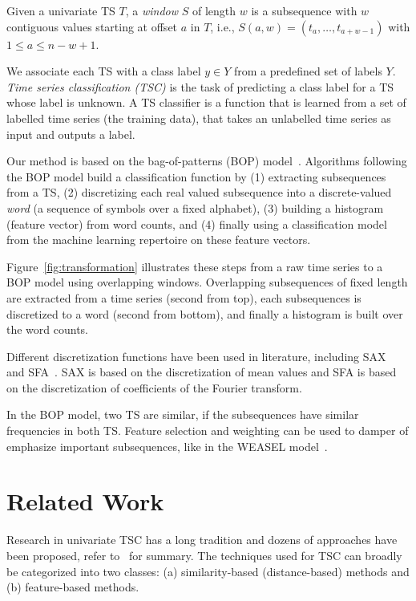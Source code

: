 \documentclass[sigconf]{acmart}
\begin{document}
Given a univariate TS $T$, a \emph{window} $S$ of length $w$ is a subsequence with $w$ contiguous values starting at offset $a$ in $T$, i.e., $S(a,w)=(t_{a},\dots,t_{a+w-1})$ with $1\leq a\leq n-w+1$.

We associate each TS with a class label $y\in Y$ from a predefined set of labels $Y$. \emph{Time series classification (TSC)} is the task of predicting a class label for a TS whose label is unknown. A TS classifier is a function that is learned from a set of labelled time series (the training data), that takes an unlabelled time series as input and outputs a label. 

Our method is based on the bag-of-patterns (BOP) model~\cite{0001KL12,schafer2014boss,schafer2015scalable2}. Algorithms following the BOP model build a classification function by (1) extracting subsequences from a TS, (2) discretizing each real valued subsequence into a discrete-valued \emph{word} (a sequence of symbols over a fixed alphabet), (3) building a histogram (feature vector) from word counts, and (4) finally using a classification model from the machine learning repertoire on these feature vectors.

Figure~\ref{fig:transformation} illustrates these steps from a raw time series to a BOP model using overlapping windows. Overlapping subsequences of fixed length are extracted from a time series (second from top), each subsequences is discretized to a word (second from bottom), and finally a histogram is built over the word counts.

Different discretization functions have been used in literature, including SAX~\cite{Lin2007} and SFA~\cite{SchaferH12}. SAX is based on the discretization of mean values and SFA is based on the discretization of coefficients of the Fourier transform. 

In the BOP model, two TS are similar, if the subsequences have similar frequencies in both TS. Feature selection and weighting can be used to damper of emphasize important subsequences, like in the WEASEL model~\cite{schaefer2017weasel}.

\section{Related Work}

Research in univariate TSC has a long tradition and  dozens of approaches have been proposed, refer to~\cite{bagnall2016great,esling2012time,benchmarkingSchaefer17} for summary. The techniques used for TSC can broadly be categorized into two classes: (a) similarity-based (distance-based) methods and (b) feature-based methods. 
\end{document}
